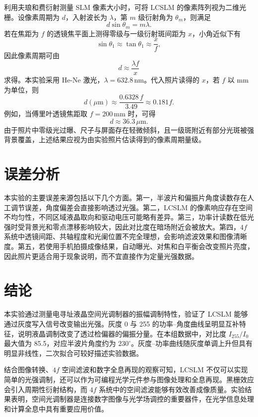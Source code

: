 \documentclass[a4paper]{ctexart}
\begin{document}
利用夫琅和费衍射测量 SLM 像素大小时，可将 LCSLM 的像素阵列视为二维光栅。设像素周期为 $d$，入射波长为 $\lambda$，第 $m$ 级衍射角为 $\theta_m$，则满足
\begin{equation}
    d\sin\theta_m=m\lambda .
\end{equation}
若在焦距为 $f$ 的透镜焦平面上测得零级与一级衍射斑间距为 $x$，小角近似下有
\begin{equation}
    \sin\theta_1 \approx \tan\theta_1 \approx \frac{x}{f},
\end{equation}
因此像素周期可由
\begin{equation}
    d \approx \frac{\lambda f}{x}
\end{equation}
求得。本实验采用 He-Ne 激光，$\lambda=632.8\,\mathrm{nm}$。代入照片读得的 $x$，若 $f$ 以 $\mathrm{mm}$ 为单位，则
\begin{equation}
    d(\mu\mathrm{m})\approx
    \frac{0.6328\,f}{3.49}
    \approx 0.181f .
\end{equation}
例如，当傅里叶透镜焦距取 $f=200\,\mathrm{mm}$ 时，可得
\begin{equation}
    d\approx 36.3\,\mu\mathrm{m}.
\end{equation}
由于照片中零级光过曝、尺子与屏面存在轻微倾斜，且一级斑附近有部分光斑被强背景覆盖，上述结果应视为由实验照片估读得到的像素周期量级。

\section{误差分析}

本实验的主要误差来源包括以下几个方面。第一，半波片和偏振片角度读数存在人工调节误差，角度偏差会直接影响透过光强。第二，LCSLM 的像素响应存在空间不均匀性，不同区域液晶取向和驱动电压可能略有差异。第三，功率计读数在低光强时受背景光和零点漂移影响较大，因此对比度在暗场附近会被放大。第四，$4f$ 系统中透镜间距、共轴程度和光阑位置不完全理想，会影响滤波效果和图像清晰度。第五，若使用手机拍摄成像结果，自动曝光、对焦和白平衡会改变照片亮度，因此照片更适合用于现象说明，而不宜直接作为定量光强数据。

\section{结论}

本实验通过测量电寻址液晶空间光调制器的振幅调制特性，验证了 LCSLM 能够通过灰度写入信号改变输出光强。灰度 0 与 255 的功率--角度曲线呈明显互补特征，说明液晶调制改变了透过检偏器的偏振分量。在本组数据中，对比度 $I_{255}/I_0$ 最大值为 85.5，对应半波片角度约为 $230^\circ$。灰度--功率曲线随灰度单调上升但具有明显非线性，二次拟合可较好描述实验数据。

结合图像转换、$4f$ 空间滤波和数字全息再现的观察可知，LCSLM 不仅可以实现简单的光强调制，还可以作为可编程光学元件参与图像处理和全息再现。黑栅效应会引入周期性衍射结构，而 $4f$ 系统中的空间滤波能够有效改善成像质量。实验结果表明，空间光调制器是连接数字图像与光学场调控的重要器件，在光学信息处理和计算全息中具有重要应用价值。
\end{document}
